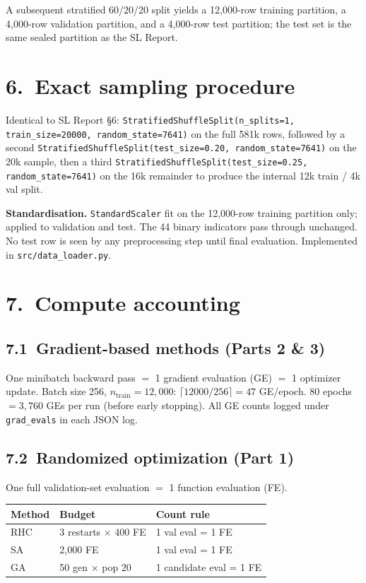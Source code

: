 \documentclass[11pt]{article}
\begin{document}
A subsequent stratified 60/20/20 split yields a 12{,}000-row training
partition, a 4{,}000-row validation partition, and a 4{,}000-row test
partition; the test set is the same sealed partition as the SL Report.

\section*{6.\ Exact sampling procedure}

Identical to SL Report §6: \texttt{StratifiedShuffleSplit(n\_splits=1,
train\_size=20000, random\_state=7641)} on the full 581k rows, followed
by a second \texttt{StratifiedShuffleSplit(test\_size=0.20,
random\_state=7641)} on the 20k sample, then a third
\texttt{StratifiedShuffleSplit(test\_size=0.25, random\_state=7641)} on
the 16k remainder to produce the internal 12k train / 4k val split.

\noindent\textbf{Standardisation.}
\texttt{StandardScaler} fit on the 12{,}000-row training partition only;
applied to validation and test. The 44 binary indicators pass through
unchanged. No test row is seen by any preprocessing step until final
evaluation. Implemented in \texttt{src/data\_loader.py}.

\section*{7.\ Compute accounting}

\subsection*{7.1\ Gradient-based methods (Parts 2 \& 3)}
One minibatch backward pass $=$ 1 gradient evaluation (GE) $=$ 1 optimizer
update. Batch size 256, $n_{\text{train}}{=}12{,}000$:
$\lceil12000/256\rceil{=}47$ GE/epoch.
80 epochs $= 3{,}760$ GEs per run (before early stopping).
All GE counts logged under \texttt{grad\_evals} in each JSON log.

\subsection*{7.2\ Randomized optimization (Part 1)}
One full validation-set evaluation $=$ 1 function evaluation (FE).
\begin{center}
\begin{tabular}{lll}
\toprule
\textbf{Method} & \textbf{Budget} & \textbf{Count rule} \\
\midrule
RHC & 3 restarts $\times$ 400 FE & 1 val eval = 1 FE \\
SA  & 2{,}000 FE & 1 val eval = 1 FE \\
GA  & 50 gen $\times$ pop 20 & 1 candidate eval = 1 FE \\
\bottomrule
\end{tabular}
\end{center}
\end{document}
